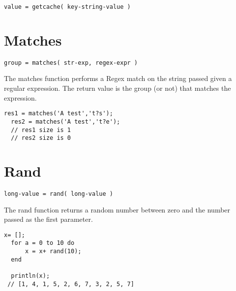 \begin{Verbatim}
value = getcache( key-string-value )
\end{Verbatim}

\section{Matches}
\begin{Verbatim}
group = matches( str-exp, regex-expr )
\end{Verbatim}

The matches function performs a Regex match on the string passed given
a regular expression. The return value is the group (or not) that matches the expression.

\begin{lstlisting}[caption={matches example}]
  res1 = matches('A test','t?s');
  res2 = matches('A test','t?e');
  // res1 size is 1
  // res2 size is 0
\end{lstlisting}

\section{Rand}
\begin{Verbatim}
long-value = rand( long-value )
\end{Verbatim}

The rand function returns a random number between zero and the number passed as the
first parameter.

\begin{lstlisting}[caption={rand example}]
  x= [];
  for a = 0 to 10 do
      x = x+ rand(10);
  end

  println(x);
 // [1, 4, 1, 5, 2, 6, 7, 3, 2, 5, 7]
\end{lstlisting}
